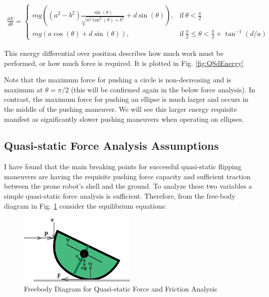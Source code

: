\documentclass[letterpaper]{report}
\begin{document}
\begin{align}
  \frac{dE}{d\theta} =
  \begin{cases}
    mg ( (a^2 - b^2) \frac{\sin(\theta)}{\sqrt{a^2 \tan^2(\theta) + b^2}} + d \sin(\theta) ), & \text{if}\ \theta < \frac{\pi}{2} \\
    mg (a \cos(\theta) + d \sin(\theta) ), & \text{if}\ \frac{\pi}{2} \leq \theta < \frac{\pi}{2} + \tan^{-1}(d/a)
  \end{cases}
  \label{eq:QSdEnergy}
\end{align}

This energy differential over position describes how much work must be performed, or how much force is required.
It is plotted in Fig. \ref{fig:QSdEnergy}

Note that the maximum force for pushing a circle is non-decreasing and is maximum at $\theta = \pi/2$ (this will be confirmed again in the below force analysis).
In contrast, the maximum force for pushing an ellipse is much larger and occurs in the middle of the pushing maneuver.
We will see this larger energy requisite manifest as significantly slower pushing maneuvers when operating on ellipses.

\subsection{Quasi-static Force Analysis Assumptions}
I have found that the main breaking points for successful quasi-static flipping maneuvers are having the requisite pushing force capacity and sufficient traction between the prone robot's shell and the ground.
To analyze these two variables a simple quasi-static force analysis is sufficient.
Therefore, from the free-body diagram in Fig. \ref{f:QS_FBD} consider the equilibrium equations:

\begin{figure}[ht]
\centering
\includegraphics[width=0.5\textwidth]{QS_FreeBodyDiagram2.eps}
\caption{\label{f:QS_FBD}Freebody Diagram for Quasi-static Force and Friction Analysis}
\end{figure}
\end{document}

